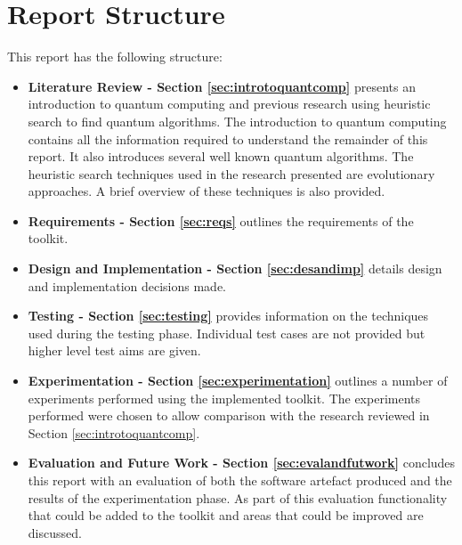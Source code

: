 \section{Report Structure}
This report has the following structure:
\begin{itemize}
 \item \textbf{Literature Review - Section \ref{sec:introtoquantcomp}} presents an introduction to quantum computing and previous research using heuristic search to find quantum algorithms.
The introduction to quantum computing contains all the information required to understand the remainder of this report.
It also introduces several well known quantum algorithms.
The heuristic search techniques used in the research presented are evolutionary approaches.
A brief overview of these techniques is also provided.
 \item \textbf{Requirements - Section \ref{sec:reqs}} outlines the requirements of the toolkit.
 \item \textbf{Design and Implementation - Section \ref{sec:desandimp}} details design and implementation decisions made.
 \item \textbf{Testing - Section \ref{sec:testing}} provides information on the techniques used during the testing phase.
Individual test cases are not provided but higher level test aims are given.
 \item \textbf{Experimentation - Section \ref{sec:experimentation}} outlines a number of experiments performed using the implemented toolkit.
The experiments performed were chosen to allow comparison with the research reviewed in Section \ref{sec:introtoquantcomp}.
 \item \textbf{Evaluation and Future Work - Section \ref{sec:evalandfutwork}} concludes this report with an evaluation of both the software artefact produced and the results of the experimentation phase.
As part of this evaluation functionality that could be added to the toolkit and areas that could be improved are discussed.
\end{itemize}




